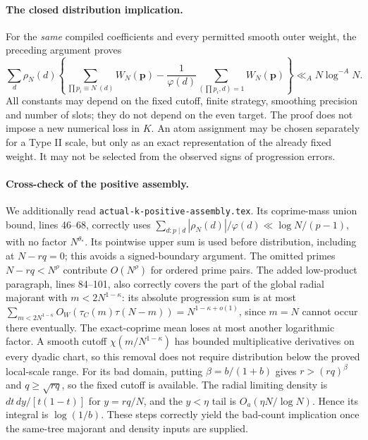 \paragraph{The closed distribution implication.}
For the \emph{same} compiled coefficients and every permitted smooth
outer weight, the preceding argument proves
\begin{equation}\label{eq:actual-k-joint-signed-distribution}
 \sum_d\rho_N(d)\left\{
  \sum_{\prod p_i\equiv N\ (d)}W_N(\boldsymbol p)
  -\frac1{\varphi(d)}\sum_{(\prod p_i,d)=1}W_N(\boldsymbol p)
 \right\}\ll_A N\log^{-A}N.
\end{equation}
All constants may depend on the fixed cutoff, finite strategy,
smoothing precision and number of slots; they do not depend on
the even target. The proof does not impose a new numerical loss in
$K$. An atom assignment may be chosen separately for a Type II scale,
but only as an exact representation of the already fixed weight.
It may not be selected from the observed signs of progression errors.

\paragraph{Cross-check of the positive assembly.}
We additionally read \texttt{actual-k-positive-assembly.tex}. Its
coprime-mass union bound, lines 46--68, correctly uses
$\sum_{d:p\mid d}|\rho_N(d)|/\varphi(d)\ll\log N/(p-1)$,
with no factor $N^{\theta_*}$. Its pointwise upper sum is used before
distribution, including at $N-rq=0$; this avoids a signed-boundary
argument. The omitted primes $N-rq<N^\rho$ contribute $O(N^\rho)$
for ordered prime pairs. The added low-product paragraph, lines
84--101, also correctly covers the part of the global radial majorant
with $m<2N^{1-\kappa}$: its absolute progression sum is at most
$\sum_{m<2N^{1-\kappa}}O_W(\tau_C(m)\tau(N-m))
 =N^{1-\kappa+o(1)}$, since $m=N$ cannot occur there eventually.
The exact-coprime mean loses at most another logarithmic factor.
A smooth cutoff $\chi(m/N^{1-\kappa})$ has bounded multiplicative
derivatives on every dyadic chart, so this removal does not require
distribution below the proved local-scale range. For its bad domain, putting
$\beta=b/(1+b)$ gives $r>(rq)^\beta$ and $q\ge\sqrt{rq}$,
so the fixed cutoff is available. The radial limiting density is
$dt\,dy/[t(1-t)]$ for $y=rq/N$, and the $y<\eta$ tail is
$O_a(\eta N/\log N)$. Hence its integral is $\log(1/b)$.
These steps correctly yield the bad-count implication once the
same-tree majorant and density inputs are supplied.

